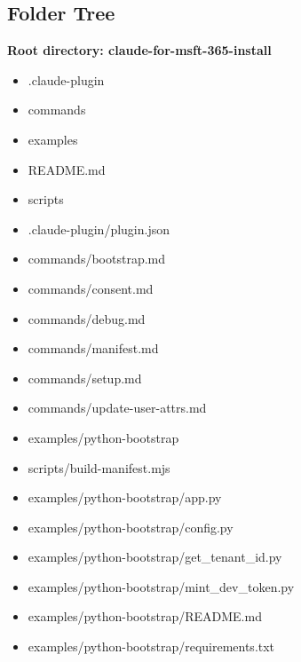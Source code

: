 \documentclass[11pt]{article}
\begin{document}
\subsection{Folder Tree}
\textbf{Root directory: claude-for-msft-365-install}
\begin{itemize}[leftmargin=*,itemsep=1pt,topsep=2pt]
\item \hspace*{0.0em}.claude-plugin
\item \hspace*{0.0em}commands
\item \hspace*{0.0em}examples
\item \hspace*{0.0em}README.md
\item \hspace*{0.0em}scripts
\item \hspace*{0.9em}.claude-plugin/plugin.json
\item \hspace*{0.9em}commands/bootstrap.md
\item \hspace*{0.9em}commands/consent.md
\item \hspace*{0.9em}commands/debug.md
\item \hspace*{0.9em}commands/manifest.md
\item \hspace*{0.9em}commands/setup.md
\item \hspace*{0.9em}commands/update-user-attrs.md
\item \hspace*{0.9em}examples/python-bootstrap
\item \hspace*{0.9em}scripts/build-manifest.mjs
\item \hspace*{1.8em}examples/python-bootstrap/app.py
\item \hspace*{1.8em}examples/python-bootstrap/config.py
\item \hspace*{1.8em}examples/python-bootstrap/get\_\allowbreak{}tenant\_\allowbreak{}id.py
\item \hspace*{1.8em}examples/python-bootstrap/mint\_\allowbreak{}dev\_\allowbreak{}token.py
\item \hspace*{1.8em}examples/python-bootstrap/README.md
\item \hspace*{1.8em}examples/python-bootstrap/requirements.txt
\end{itemize}
\end{document}
